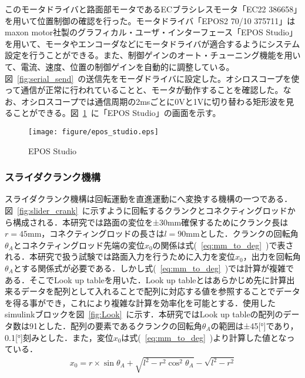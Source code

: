 \documentclass[a4paper,12pt]{article_vdlab_sotsuron}
\begin{document}
\vspace*{10mm}
このモータドライバと路面部モータであるECブラシレスモータ「EC22 386658」を用いて位置制御の確認を行った。モータドライバ「EPOS2 70/10 375711」はmaxon motor社製のグラフィカル・ユーザ・インターフェース「EPOS Studio」を用いて、モータやエンコーダなどにモータドライバが適合するようにシステム設定を行うことができる。\cite{22}また、制御ゲインのオート・チューニング機能を用いて、電流、速度、位置の制御ゲインを自動的に調整している。図~\ref{fig:serial_send}~の送信先をモーダドライバに設定した。オシロスコープを使って通信が正常に行われていることと、モータが動作することを確認した。なお、オシロスコープでは通信周期の2msごとに0Vと1Vに切り替わる矩形波を見ることができる。図~\ref{fig:epos_studio}~に「EPOS Studio」の画面を示す。

\vspace*{10mm}
\begin{figure}[htp]
  \begin{center}
    \texttt{[image: figure/epos\_studio.eps]}
    \vspace*{3mm}
    \caption{EPOS Studio}
    \label{fig:epos_studio}
  \end{center}
\end{figure}

\newpage
\subsubsection{スライダクランク機構}
スライダクランク機構は回転運動を直進運動にへ変換する機構の一つである．図~\ref{fig:slider_crank}~に示すように回転するクランクとコネクティングロッドから構成される．本研究では路面の変位を±30mm確保するためにクランク長は$r=45$mm，コネクティングロッドの長さは$l=90$mmとした．クランクの回転角$\theta _{A}$とコネクティングロッド先端の変位$x_0$の関係は式(~\ref{eq:mm_to_deg}~)で表される．本研究で扱う試験では路面入力を行うために入力を変位$x_0$，出力を回転角$\theta _{A}$とする関係式が必要である．しかし式(~\ref{eq:mm_to_deg}~)では計算が複雑である．そこでLook up tableを用いた．Look up tableとはあらかじめ先に計算出来るデータを配列として入れることで配列に対応する値を参照することでデータを得る事ができ，これにより複雑な計算を効率化を可能とする．使用したsimulinkブロックを図~\ref{fig:Look}~に示す．本研究ではLook up tableの配列のデータ数は91とした．配列の要素であるクランクの回転角$\theta _{A}$の範囲は±45[°]であり，0.1[°]刻みとした．また，変位$x_0$は式(~\ref{eq:mm_to_deg}~)より計算した値となっている．
\begin{eqnarray}
 \label{eq:mm_to_deg}
x_{0} =r\times \sin \theta _{A} +\sqrt{l^{2} -r^{2}\cos^{2} \theta _{A}} -\sqrt{l^{2} -r^{2}}
 \end{eqnarray}
\end{document}
